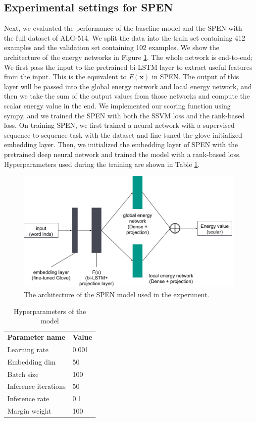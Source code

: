 \documentclass[11pt,letterpaper]{article}
\begin{document}
\subsection{Experimental settings for SPEN}
Next, we evaluated the performance of the baseline model and the SPEN with the full dataset of ALG-514. We split the data into the train set containing 412 examples and the validation set containing 102 examples. We show the architecture of the energy networks in Figure \ref{spen-architecture}. The whole network is end-to-end; We first pass the input to the pretrained bi-LSTM layer to extract useful features from the input. This is the equivalent to $F(\mathbf{x})$ in SPEN. The output of this layer will be passed into the global energy network and local energy network, and then we take the sum of the output values from those networks and compute the scalar energy value in the end. We implemented our scoring function using sympy, and we trained the SPEN with both the SSVM loss and the rank-based loss. On training SPEN, we first trained a neural network with a supervised sequence-to-sequence task with the dataset and fine-tuned the glove initialized embedding layer. Then, we initialized the embedding layer of SPEN with the pretrained deep neural network and trained the model with a rank-based loss. Hyperparameters used during the training are shown in Table \ref{params}.
\begin{figure}[ht]
	\centering
	\includegraphics[bb=0 0 609 324, scale=0.35]{spen_architecture.pdf}
    \caption{The architecture of the SPEN model used in the experiment.}
    \label{spen-architecture}
\end{figure}
%
\begin{table}[]
\centering
\caption{Hyperparameters of the model}
\label{params}
\begin{tabular}{ll}
\textbf{Parameter name} & \textbf{Value} \\
Learning rate           & 0.001          \\
Embedding dim           & 50             \\
Batch size              & 100            \\
Inference iterations    & 50             \\
Inference rate          & 0.1            \\
Margin weight           & 100           
\end{tabular}
\end{table}
\end{document}
